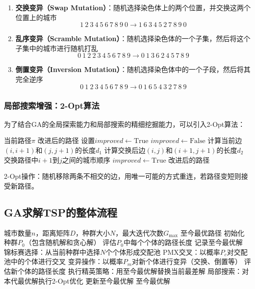 \begin{enumerate}
    \item \textbf{交换变异（Swap Mutation）}：随机选择染色体上的两个位置，并交换这两个位置上的城市
    \[
    1\ 2\ 3\ 4\ 5\ 6\ 7\ 8\ 9\ 0 \to 1\ 6\ 3\ 4\ 5\ 2\ 7\ 8\ 9\ 0
    \]
    
    \item \textbf{乱序变异（Scramble Mutation）}：随机选择染色体的一个子集，然后将这个子集中的城市进行随机打乱
    \[
    0\ 1\ 2\ 2\ 3\ 4\ 5\ 6\ 7\ 8\ 9 \to 0\ 1\ 3\ 6\ 2\ 4\ 5\ 7\ 8\ 9
    \]
    
    \item \textbf{倒置变异（Inversion Mutation）}：随机选择染色体中的一个子段，然后将其完全逆序
    \[
    0\ 1\ 2\ 3\ 4\ 5\ 6\ 7\ 8\ 9 \to 0\ 1\ 6\ 5\ 4\ 3\ 2\ 7\ 8\ 9
    \]
\end{enumerate}

\subsubsection{局部搜索增强：2-Opt算法}

为了结合GA的全局探索能力和局部搜索的精细挖掘能力，可以引入2-Opt算法：

\begin{algorithm}[H]
\caption{2-Opt局部搜索}
\begin{algorithmic}[1]
\REQUIRE 当前路径$\pi$
\ENSURE 改进后的路径
\STATE 设置$improved \gets \text{True}$
    \STATE $improved \gets \text{False}$
            \STATE 计算当前边$(i, i+1)$和$(j, j+1)$的长度$d_1$
            \STATE 计算交换后边$(i, j)$和$(i+1, j+1)$的长度$d_2$
                \STATE 交换路径中$i+1$到$j$之间的城市顺序
                \STATE $improved \gets \text{True}$
            \ENDIF
        \ENDFOR
    \ENDFOR
\ENDWHILE
\RETURN 改进后的路径
\end{algorithmic}
\end{algorithm}

2-Opt操作：随机移除两条不相交的边，用唯一可能的方式重连，若路径变短则接受新路径。

\subsection{GA求解TSP的整体流程}

\begin{algorithm}[H]
\caption{GA for TSP with Local Search}
\begin{algorithmic}[1]
\REQUIRE 城市数量$n$，距离矩阵$D$，种群大小$N$，最大迭代次数$G_{\max}$
\ENSURE 至今最优路径
\STATE 初始化种群$P_0$（包含随机解和贪心解）
\STATE 评估$P_0$中每个个体的路径长度
\STATE 记录至今最优解
    \STATE 锦标赛选择：从当前种群中选择$N$个个体形成交配池
    \STATE PMX交叉：以概率$P_c$对交配池中的个体进行交叉
    \STATE 变异操作：以概率$P_m$对新个体进行变异（交换、倒置等）
    \STATE 评估新个体的路径长度
    \STATE 执行精英策略：用至今最优解替换当前最差解
    \STATE 局部搜索：对本代最优解执行2-Opt优化
    \STATE 更新至今最优解
\ENDFOR
\RETURN 至今最优解
\end{algorithmic}
\end{algorithm}

